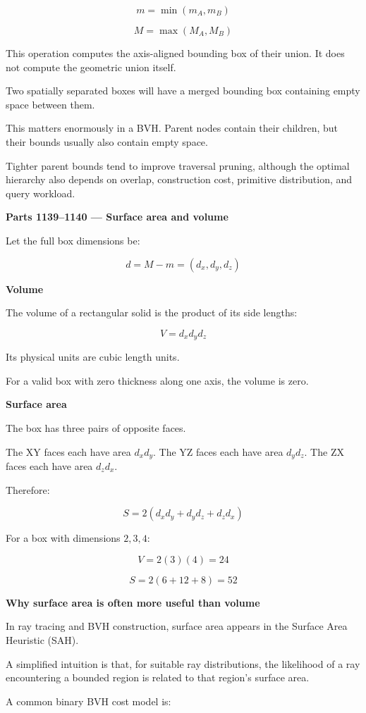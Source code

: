 \[
\boxed{ m=\min(m_A,m_B) }
\]

\[
\boxed{ M=\max(M_A,M_B) }
\]

This operation computes the axis-aligned bounding box of their union. It does not compute the geometric union itself.

Two spatially separated boxes will have a merged bounding box containing empty space between them.

This matters enormously in a BVH. Parent nodes contain their children, but their bounds usually also contain empty space.

Tighter parent bounds tend to improve traversal pruning, although the optimal hierarchy also depends on overlap, construction cost, primitive distribution, and query workload.

\textbf{Parts 1139--1140 --- Surface area and volume}

Let the full box dimensions be:

\[
d=M-m=(d_x,d_y,d_z)
\]

\textbf{Volume}

The volume of a rectangular solid is the product of its side lengths:

\[
\boxed{ V=d_xd_yd_z }
\]

Its physical units are cubic length units.

For a valid box with zero thickness along one axis, the volume is zero.

\textbf{Surface area}

The box has three pairs of opposite faces.

The XY faces each have area \(d_xd_y\). The YZ faces each have area \(d_yd_z\). The ZX faces each have area \(d_zd_x\).

Therefore:

\[
\boxed{ S=2(d_xd_y+d_yd_z+d_zd_x) }
\]

For a box with dimensions \(2,3,4\):

\[
V=2(3)(4)=24
\]

\[
S=2(6+12+8)=52
\]

\textbf{Why surface area is often more useful than volume}

In ray tracing and BVH construction, surface area appears in the Surface Area Heuristic (SAH).

A simplified intuition is that, for suitable ray distributions, the likelihood of a ray encountering a bounded region is related to that region's surface area.

A common binary BVH cost model is:


